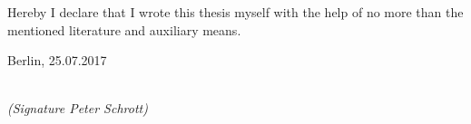 \newpage

\thispagestyle{empty}

\begin{large}

\vspace*{6cm}

\noindent
Hereby I declare that I wrote this thesis myself with the help of no more than the mentioned literature and auxiliary means.
\vspace{2cm}

\noindent
Berlin, 25.07.2017

\vspace{3cm}

\hspace*{7cm}%
\dotfill\\
\hspace*{8.5cm}%
\textit{(Signature Peter Schrott)}

\end{large}
